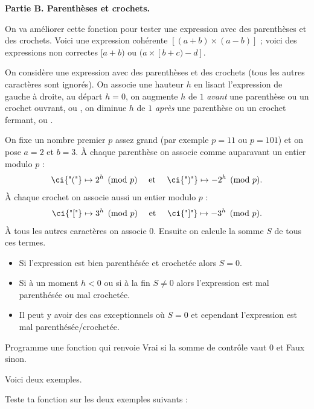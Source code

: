 \documentclass[11pt,class=report,crop=false]{standalone}
\begin{document}
\begin{activite}
\textbf{Partie B. Parenthèses et crochets.}

On va améliorer cette fonction pour tester une expression avec des parenthèses et des crochets.
Voici une expression cohérente \og{}$[(a+b)\times(a-b)]$\fg{} ; voici des expressions non correctes \og{}$[a+b)$\fg{} ou \og{}$(a\times[b+c)-d]$\fg{}.


On considère une expression avec des parenthèses et des crochets (tous les autres caractères sont ignorés). On associe une hauteur $h$ en lisant l'expression de gauche à droite, au départ 
$h=0$, on augmente $h$ de $1$ \emph{avant} une parenthèse ou un crochet ouvrant,  ou \ci{"["}, on diminue $h$ de $1$ \emph{après} une parenthèse ou un crochet fermant,  ou  \ci{"]"}.

On fixe un nombre premier $p$ assez grand (par exemple $p=11$ ou $p=101$) et on pose $a=2$ et $b=3$.
\`A chaque parenthèse on associe comme auparavant un entier modulo $p$ :
$$ \text{\ci{"("}} \mapsto 2^h \pmod{p} \quad \text{ et }\quad \text{\ci{")"}} \mapsto -2^h \pmod{p}.$$
\`A chaque crochet on associe aussi un entier modulo $p$ :
$$ \text{\ci{"["}} \mapsto 3^h \pmod{p} \quad \text{ et }\quad \text{\ci{"]"}} \mapsto -3^h \pmod{p}.$$
\`A tous les autres caractères on associe $0$.
Ensuite on calcule la somme $S$ de tous ces termes.



\begin{itemize}
	\item Si l'expression est bien parenthésée et crochetée alors $S=0$.
	\item Si à un moment $h<0$ ou si à la fin $S \neq 0$ alors l'expression est mal parenthésée ou mal crochetée.
	\item Il peut y avoir des cas exceptionnels où $S=0$ et cependant l'expression est mal parenthésée/crochetée.
\end{itemize}

Programme une fonction  qui renvoie
\og{}Vrai\fg{} si la somme de contrôle vaut $0$ et \og{}Faux\fg{} sinon.


Voici deux exemples.


Teste ta fonction sur les deux exemples suivants :
\mycenterline{\ci{"[[[()](()[((([[]])()(([[[]][()]]])))])]]"}}



\end{activite}
\end{document}
